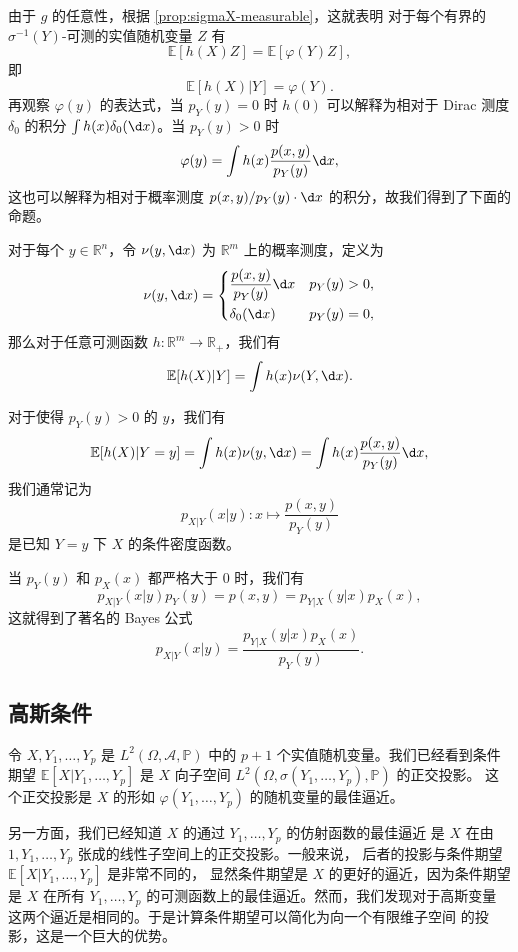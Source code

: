由于 $g$ 的任意性，根据 \autoref{prop:sigmaX-measurable}，这就表明
对于每个有界的 $\sigma^{-1}(Y)$-可测的实值随机变量 $Z$ 有
\[
  \mathbb{E}[h(X)Z]=\mathbb{E}[\varphi(Y)Z],  
\]
即
\[
  \mathbb{E}[h(X)|Y]=\varphi(Y).  
\]
再观察 $\varphi(y)$ 的表达式，当 $p_Y(y)=0$ 时 $h(0)$ 可以解释为相对于
Dirac 测度 $\delta_0$ 的积分 $\int h(x)\delta_0(\d x)$。当
$p_Y(y)>0$ 时
\[
  \varphi(y)=\int h(x)\frac{p(x,y)}{p_Y(y)}\d x,
\]
这也可以解释为相对于概率测度 $p(x,y)/p_Y(y) \cdot \d x$ 的积分，故我们得到了下面的命题。

\begin{proposition}
  对于每个 $y\in \mathbb{R}^n$，令 $\nu(y,\d x)$ 为
  $\mathbb{R}^m$ 上的概率测度，定义为
  \[
    \nu(y,\d x)=\begin{dcases}
      \frac{p(x,y)}{p_Y(y)}\d x & p_Y(y)>0,\\
      \delta_0(\d x) & p_Y(y)=0,
    \end{dcases}  
  \]
  那么对于任意可测函数 $h:\mathbb{R}^m\to \mathbb{R}_+$，我们有
  \[
    \mathbb{E}[h(X)|Y]=\int h(x)\nu(Y,\d x).  
  \]
\end{proposition}

对于使得 $p_Y(y)>0$ 的 $y$，我们有
\[
  \mathbb{E}[h(X)|Y=y]=\int h(x)\nu(y,\d x)
  =\int h(x)\frac{p(x,y)}{p_Y(y)}\d x,  
\]
我们通常记为
\[
  p_{X|Y}(x|y):x\mapsto\frac{p(x,y)}{p_Y(y)}  
\]
是已知 $Y=y$ 下 $X$ 的条件密度函数。

当 $p_Y(y)$ 和 $p_X(x)$ 都严格大于 $0$ 时，我们有
\[
  p_{X|Y}(x|y)p_Y(y)=p(x,y)=p_{Y|X}(y|x)p_X(x),
\]
这就得到了著名的 Bayes 公式
\[
  p_{X|Y}(x|y)=\frac{p_{Y|X}(y|x)p_X(x)}{p_Y(y)}.
\]

\subsection{高斯条件}

令 $X,Y_1,\dots,Y_p$ 是 $L^2(\Omega,\mathcal{A},\mathbb{P})$ 中的 $p+1$
个实值随机变量。我们已经看到条件期望 $\mathbb{E}[X|Y_1,\dots,Y_p]$
是 $X$ 向子空间 $L^2(\Omega,\sigma(Y_1,\dots,Y_p),\mathbb{P})$ 的正交投影。
这个正交投影是 $X$ 的形如 $\varphi(Y_1,\dots,Y_p)$ 的随机变量的最佳逼近。

另一方面，我们已经知道 $X$ 的通过 $Y_1,\dots,Y_p$ 的仿射函数的最佳逼近
是 $X$ 在由 $1,Y_1,\dots,Y_p$ 张成的线性子空间上的正交投影。一般来说，
后者的投影与条件期望 $\mathbb{E}[X|Y_1,\dots,Y_p]$ 是非常不同的，
显然条件期望是 $X$ 的更好的逼近，因为条件期望是 $X$ 在所有
$Y_1,\dots,Y_p$ 的可测函数上的最佳逼近。然而，我们发现对于高斯变量
这两个逼近是相同的。于是计算条件期望可以简化为向一个有限维子空间
的投影，这是一个巨大的优势。

